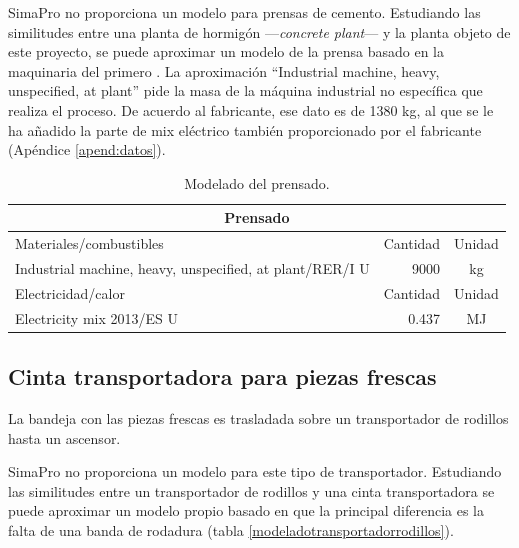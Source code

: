 SimaPro no proporciona un modelo para prensas de cemento. Estudiando las similitudes entre una planta de hormigón —\textit{concrete plant}— y la planta objeto de este proyecto, se puede aproximar un modelo de la prensa basado en la maquinaria del primero \cite{buildingproducts}. La aproximación ``Industrial machine, heavy, unspecified, at plant'' pide la masa de la máquina industrial no específica que realiza el proceso. De acuerdo al fabricante, ese dato es de 1380 \si{kg}, al que se le ha añadido la parte de mix eléctrico también proporcionado por el fabricante (Apéndice \ref{apend:datos}).

\begin{table}[!htb]
\centering
\begin{tabular}{p{8cm}rc}
\toprule
\multicolumn{3}{c}{Prensado}\\
\midrule
Materiales/combustibles & Cantidad & Unidad\\
\midrule
Industrial machine, heavy, unspecified, at plant/RER/I U & 9000 & \si{kg}\\
\midrule
Electricidad/calor & Cantidad & Unidad\\
\midrule
Electricity mix 2013/ES U & 0.437 & \si{MJ}\\
\bottomrule
\end{tabular}
\caption{Modelado del prensado.}
\label{modeladoprensado}
\end{table}

\subsection{Cinta transportadora para piezas frescas}

La bandeja con las piezas frescas es trasladada sobre un transportador de rodillos hasta un ascensor.

SimaPro no proporciona un modelo para este tipo de transportador. Estudiando las similitudes entre un transportador de rodillos y una cinta transportadora se puede aproximar un modelo propio basado en que la principal diferencia es la falta de una banda de rodadura (tabla \ref{modeladotransportadorrodillos}).

